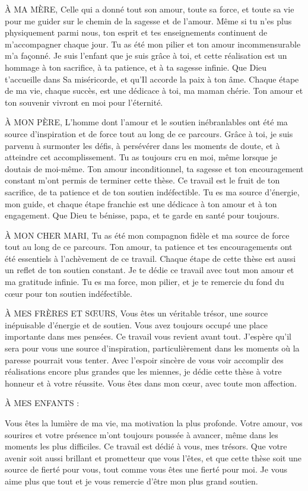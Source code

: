 \documentclass[12pt,oneside]{report}
\begin{document}
À MA MÈRE, Celle qui a donné tout son amour, toute sa force, et toute sa vie pour me guider sur le chemin de la sagesse et de l’amour. Même si tu n'es plus physiquement parmi nous, ton esprit et tes enseignements continuent de m'accompagner chaque jour. Tu as été mon pilier et ton amour incommensurable m’a façonné. Je suis l’enfant que je suis grâce à toi, et cette réalisation est un hommage à ton sacrifice, à ta patience, et à ta sagesse infinie. Que Dieu t’accueille dans Sa miséricorde, et qu'Il accorde la paix à ton âme. Chaque étape de ma vie, chaque succès, est une dédicace à toi, ma maman chérie. Ton amour et ton souvenir vivront en moi pour l’éternité.

À MON PÈRE, L'homme dont l'amour et le soutien inébranlables ont été ma source d'inspiration et de force tout au long de ce parcours. Grâce à toi, je suis parvenu à surmonter les défis, à persévérer dans les moments de doute, et à atteindre cet accomplissement. Tu as toujours cru en moi, même lorsque je doutais de moi-même. Ton amour inconditionnel, ta sagesse et ton encouragement constant m’ont permis de terminer cette thèse. Ce travail est le fruit de ton sacrifice, de ta patience et de ton soutien indéfectible. Tu es ma source d'énergie, mon guide, et chaque étape franchie est une dédicace à ton amour et à ton engagement. Que Dieu te bénisse, papa, et te garde en santé pour toujours.

À MON CHER MARI, Tu as été mon compagnon fidèle et ma source de force tout au long de ce parcours. Ton amour, ta patience et tes encouragements ont été essentiels à l’achèvement de ce travail. Chaque étape de cette thèse est aussi un reflet de ton soutien constant. Je te dédie ce travail avec tout mon amour et ma gratitude infinie. Tu es ma force, mon pilier, et je te remercie du fond du cœur pour ton soutien indéfectible.

À MES FRÈRES ET SŒURS, Vous êtes un véritable trésor, une source inépuisable d’énergie et de soutien. Vous avez toujours occupé une place importante dans mes pensées. Ce travail vous revient avant tout. J’espère qu’il sera pour vous une source d’inspiration, particulièrement dans les moments où la paresse pourrait vous tenter. Avec l’espoir sincère de vous voir accomplir des réalisations encore plus grandes que les miennes, je dédie cette thèse à votre honneur et à votre réussite. Vous êtes dans mon cœur, avec toute mon affection.

À MES ENFANTS :

Vous êtes la lumière de ma vie, ma motivation la plus profonde. Votre amour, vos sourires et votre présence m'ont toujours poussée à avancer, même dans les moments les plus difficiles. Ce travail est dédié à vous, mes trésors. Que votre avenir soit aussi brillant et prometteur que vous l'êtes, et que cette thèse soit une source de fierté pour vous, tout comme vous êtes une fierté pour moi. Je vous aime plus que tout et je vous remercie d’être mon plus grand soutien.
\end{document}

